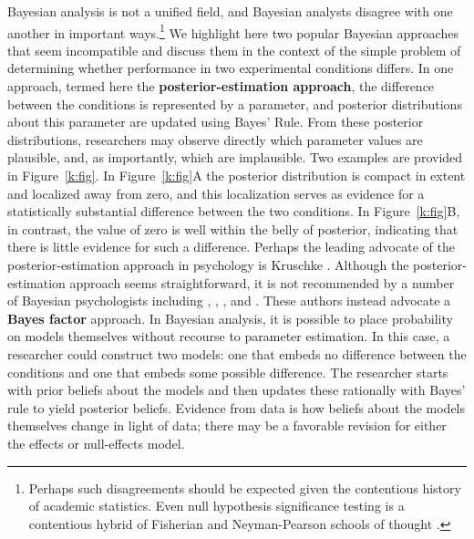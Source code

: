 Bayesian analysis is not a unified field, and Bayesian analysts disagree with one another in important ways.\footnote{Perhaps such disagreements should be expected given the contentious history of academic statistics.  Even null hypothesis significance testing is a contentious hybrid of Fisherian and Neyman-Pearson schools of thought \cite{Gigerenzer:etal:1989,Lehmann:1993}.}   We highlight here two popular Bayesian approaches that seem incompatible and discuss them in the context of the simple problem of determining whether performance in two experimental conditions differs.  In one approach, termed here the \textbf{posterior-estimation approach}, the difference between the conditions is represented by a parameter, and posterior distributions about this parameter are updated using Bayes' Rule.  From these posterior distributions, researchers may observe directly which parameter values are plausible, and, as importantly, which are implausible.  Two examples are provided in Figure~\ref{k:fig}.  In Figure~\ref{k:fig}A the posterior distribution is compact in extent and localized away from zero, and this localization serves as evidence for a statistically substantial difference between the two conditions.  In Figure~\ref{k:fig}B, in contrast, the value of zero is well within the belly of posterior, indicating that there is little evidence for such a difference.  Perhaps the leading advocate of the posterior-estimation approach in psychology is Kruschke \cite{Kruschke:2011,Kruschke:2012}.  Although the posterior-estimation approach seems straightforward, it is not recommended by a number of Bayesian psychologists including , , , and .  These authors instead advocate a \textbf{Bayes factor} approach.  In Bayesian analysis, it is possible to place probability on models themselves without recourse to parameter estimation.   In this case, a researcher could construct two models: one that embeds no difference between the conditions and one that embeds some possible difference.  The researcher starts with prior beliefs about the models and then updates these rationally with Bayes' rule to yield posterior beliefs.  Evidence from data is how beliefs about the models themselves change in light of data; there may be a favorable revision for either the effects or null-effects model.

